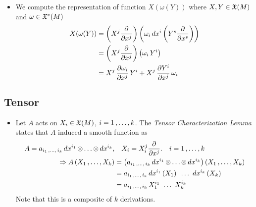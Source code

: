 \documentclass[11pt]{article}
\begin{document}
\begin{itemize}
\item We compute the representation of function $X(\omega(Y))$ where $X, Y \in {\mathfrak X}(M)$ and $\omega \in {\mathfrak X}^{*}(M)$
\begin{align*}
X(\omega(Y)) &= \left(X^j \frac{\partial }{ \partial x^j}\right)\left(\omega_i\,dx^i\left(Y^s \frac{\partial }{ \partial x^s}\right)\right) \\
&= \left(X^j \frac{\partial }{ \partial x^j}\right)\left(\omega_i\,Y^i\right) \\
&= X^j\, \frac{\partial \omega_i}{ \partial x^j}\,Y^i + X^{j}\,\frac{\partial Y^i}{ \partial x^j}\,\omega_i
\end{align*}
\end{itemize}

\subsection{Tensor}
\begin{itemize}
\item Let $A$ acts on $X_i  \in {\mathfrak X}(M)$, $i=1 \,{,}\ldots{,}\, k$. The \emph{Tensor Characterization Lemma} states that $A$ induced a smooth function as
\begin{align}
A = a_{i_1 \,{,}\ldots{,}\, i_k}\, dx^{i_1} \,{\otimes}\ldots{\otimes}\, dx^{i_k},& \quad X_i = X_i^{j}\frac{\partial }{ \partial x^j}. \quad i=1 \,{,}\ldots{,}\, k \nonumber\\
\Rightarrow A\left(X_1 \,{,}\ldots{,}\, X_k\right) &= \left(a_{i_1 \,{,}\ldots{,}\, i_k}\, dx^{i_1} \,{\otimes}\ldots{\otimes}\, dx^{i_k}\right)\left(X_1 \,{,}\ldots{,}\, X_k\right)  \nonumber\\
&= a_{i_1 \,{,}\ldots{,}\, i_k}\,dx^{i_1}\left(X_1\right) \,{\,}\ldots{\,}\,dx^{i_k}\left(X_k\right) \nonumber\\
&= a_{i_1 \,{,}\ldots{,}\, i_k}\,X_1^{i_1} \,{\,}\ldots{\,}\, X_k^{i_k} \label{eqn: tensor_characterization}
\end{align} Note that this is a composite of $k$ derivations.
\end{itemize}
\end{document}
